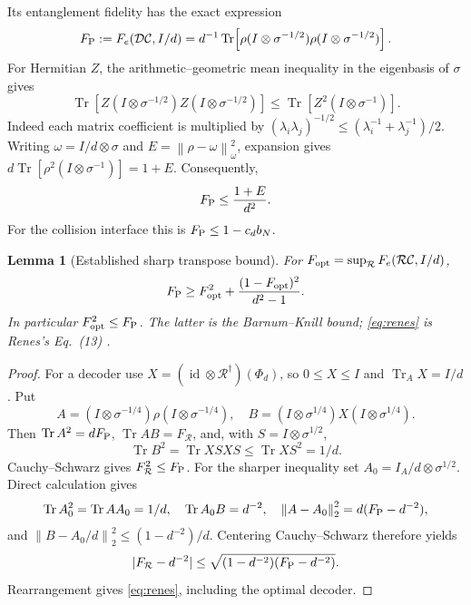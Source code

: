 \documentclass[11pt]{article}
\numberwithin{equation}{section}
\newtheorem{lemma}[theorem]{Lemma}
\theoremstyle{remark}
\newcommand{\Tr}{\operatorname{Tr}}
\newcommand{\id}{\operatorname{id}}
\newcommand{\Ccal}{\mathcal C}
\newcommand{\Dcal}{\mathcal D}
\newcommand{\norm}[1]{\left\lVert#1\right\rVert}
\begin{document}
Its entanglement fidelity has the exact expression
\begin{equation}
 F_{\rm P}:=F_e(\Dcal\Ccal,I/d)
 =d^{-1}\Tr\!\left[
   \rho(I\otimes\sigma^{-1/2})\rho(I\otimes\sigma^{-1/2})\right].
 \label{eq:petz-fidelity}
\end{equation}
For Hermitian \(Z\), the arithmetic--geometric mean inequality in the
eigenbasis of \(\sigma\) gives
\begin{equation}
 \Tr[Z(I\otimes\sigma^{-1/2})Z(I\otimes\sigma^{-1/2})]
 \le\Tr[Z^2(I\otimes\sigma^{-1})].
 \label{eq:petz-rld}
\end{equation}
Indeed each matrix coefficient is multiplied by
\((\lambda_i\lambda_j)^{-1/2}\le
(\lambda_i^{-1}+\lambda_j^{-1})/2\).
Writing \(\omega=I/d\otimes\sigma\) and
\(E=\norm{\rho-\omega}_\omega^2\), expansion gives
\(d\Tr[\rho^2(I\otimes\sigma^{-1})]=1+E\). Consequently,
\begin{equation}
 F_{\rm P}\le\frac{1+E}{d^2}.
 \label{eq:petz-energy}
\end{equation}
For the collision interface this is \(F_{\rm P}\le1-c_d b_N\).

\begin{lemma}[Established sharp transpose bound]
\label{lem:renes}
For \(F_{\rm opt}=\sup_{\mathcal R}F_e(\mathcal R\Ccal,I/d)\),
\begin{equation}
 F_{\rm P}\ge F_{\rm opt}^2+
                  \frac{(1-F_{\rm opt})^2}{d^2-1}.
 \label{eq:renes}
\end{equation}
In particular \(F_{\rm opt}^2\le F_{\rm P}\). The latter is the
Barnum--Knill bound; \eqref{eq:renes} is Renes's Eq.~(13)
\cite{BarnumKnill,Renes}.
\end{lemma}
\begin{proof}
For a decoder use \(X=(\id\otimes\mathcal R^\dagger)(\Phi_d)\), so
\(0\le X\le I\) and \(\Tr_A X=I/d\). Put
\[
 A=(I\otimes\sigma^{-1/4})\rho(I\otimes\sigma^{-1/4}),\quad
 B=(I\otimes\sigma^{1/4})X(I\otimes\sigma^{1/4}).
\]
Then \(\Tr A^2=dF_{\rm P}\), \(\Tr AB=F_{\mathcal R}\), and, with
\(S=I\otimes\sigma^{1/2}\),
\[
 \Tr B^2=\Tr XSXS\le\Tr XS^2=1/d.
\]
Cauchy--Schwarz gives \(F_{\mathcal R}^2\le F_{\rm P}\).
For the sharper inequality set \(A_0=I_A/d\otimes\sigma^{1/2}\).
Direct calculation gives
\[
 \Tr A_0^2=\Tr AA_0=1/d,\quad \Tr A_0B=d^{-2},\quad
 \norm{A-A_0}_2^2=d(F_{\rm P}-d^{-2}),
\]
and
\(\norm{B-A_0/d}_2^2\le(1-d^{-2})/d\).
Centering Cauchy--Schwarz therefore yields
\[
 |F_{\mathcal R}-d^{-2}|
 \le\sqrt{(1-d^{-2})(F_{\rm P}-d^{-2})}.
\]
Rearrangement gives \eqref{eq:renes}, including the optimal decoder.
\end{proof}
\end{document}
